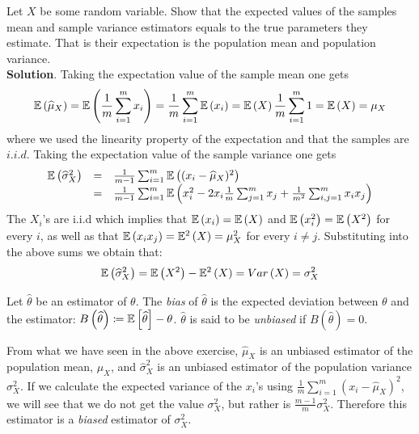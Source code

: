 \begin{exercise}
Let $X$ be some random variable. Show that the expected values of the samples mean and sample variance estimators equals to the true parameters they estimate. That is their expectation is the population mean and population variance.\\

\textbf{Solution}. Taking the expectation value of the sample mean one gets
$$
\mathbb{E}\left(\widehat{\mu}_X\right) = \mathbb{E}\left(\frac{1}{m} \sum_{i=1}^m x_i\right) = \frac{1}{m} \sum_{i=1}^m \mathbb{E}\left(x_i\right) = \mathbb{E}\left(X\right) \frac{1}{m} \sum_{i=1}^m 1 =  \mathbb{E}\left(X\right)= \mu_X
$$ 
where we used the linearity property of the expectation and that the samples are $i.i.d$. Taking the expectation value of the sample variance one gets
$$
\begin{array}{ccl}
\mathbb{E}\left(\widehat{\sigma}_X^2\right) & = & \frac{1}{m-1} \sum_{i=1}^m \mathbb{E}\left((x_i-\widehat{\mu}_X)^2\right)\\
& = & \frac{1}{m-1} \sum_{i=1}^m \mathbb{E}\left(x_i^2-2x_i\frac{1}{m} \sum_{j=1}^m x_j+\frac{1}{m^2} \sum_{i,j=1}^m x_ix_j\right)
\end{array}
$$
The $X_i$'s are i.i.d which implies that  $\mathbb{E}\left(x_i\right)=\mathbb{E}\left(X\right)$ and $\mathbb{E}\left(x_i^2\right)=\mathbb{E}\left(X^2\right)$ for every $i$, as well as that   $\mathbb{E}\left(x_ix_j\right)=\mathbb{E}^2\left(X\right)=\mu^2_X$ for every  $i\neq j$. Substituting into the above sums we obtain that:
$$
\mathbb{E}\left(\widehat{\sigma}_X^2\right) =\mathbb{E}\left(X^2\right) -\mathbb{E}^2\left(X\right)=Var\left(X\right)= \sigma^2_X
$$
\end{exercise}


\begin{definition}
Let $\widehat{\theta}$ be an estimator of $\theta$. The \textit{bias} of $\widehat{\theta}$ is the expected deviation between $\theta$ and the estimator: $B\left(\widehat{\theta}\right)\coloneqq\mathbb{E}\left[\widehat{\theta}\right]-\theta$. $\widehat{\theta}$ is said to be \textit{unbiased} if $B\left(\widehat{\theta}\right)=0$.
\end{definition}

From what we have seen in the above exercise,  $\widehat{\mu}_X$ is an unbiased estimator of the population mean, $\mu_X$, and $\widehat{\sigma}_X^2$ is an unbiased estimator of the population variance $\sigma^2_X$. If we calculate the expected variance of the $x_i$'s using $\frac{1}{m} \sum_{i=1}^m (x_i-\hat{\mu}_X)^2$, we will see that we do not get the value $\sigma^2_X$, but rather is $\frac{m-1}{m}\sigma^2_X$. Therefore this estimator is a \textit{biased} estimator of $\sigma^2_X$. 

